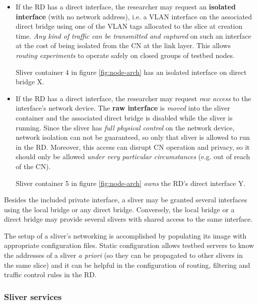 \documentclass[conference]{IEEEtran}
\begin{document}
\begin{itemize}

\item If the RD has a direct interface, the researcher may request an
  \textbf{isolated interface} (with no network address), i.e. a VLAN interface on the
  associated direct bridge using one of the VLAN tags allocated to the slice
  at creation time.  \emph{Any kind of traffic can be transmitted and
    captured} on such an interface at the cost of being isolated from the CN
  at the link layer.  This allows \emph{routing experiments} to operate safely
  on closed groups of testbed nodes.

  Sliver container 4 in figure \ref{fig:node-arch} has an isolated interface
  on direct bridge X.

\item If the RD has a direct interface, the researcher may request \emph{raw
  access} to the interface's network device.  The \textbf{raw interface} is
  \emph{moved} into the sliver container and the associated direct bridge is
  disabled while the sliver is running.  Since the sliver has \emph{full
    physical control} on the network device, network isolation can not be
  guaranteed, so only that sliver is allowed to run in the RD.  Moreover, this
  access can disrupt CN operation and privacy, so it should only be allowed
  \emph{under very particular circumstances} (e.g. out of reach of the CN).

  Sliver container 5 in figure \ref{fig:node-arch} \emph{owns} the RD's direct
  interface Y.

\end{itemize}

Besides the included private interface, a sliver may be granted several
interfaces using the local bridge or any direct bridge.  Conversely, the local
bridge or a direct bridge may provide several slivers with shared access to
the same interface.

The setup of a sliver's networking is accomplished by populating its image
with appropriate configuration files.  Static configuration allows testbed
servers to know the addresses of a sliver \emph{a priori} (so they can be
propagated to other slivers in the same slice) and it can be helpful in the
configuration of routing, filtering and traffic control rules in the RD.

\subsubsection{Sliver services}
\label{sec:sliver-services}
\end{document}
